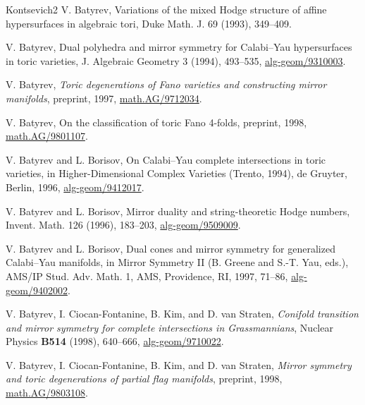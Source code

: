 \begin{thebibliography}{Kontsevich2}
\hypertarget{bib:Batyrev3}{}
V. Batyrev, Variations of the mixed Hodge structure of affine hypersurfaces in algebraic tori, Duke Math. J. 69 (1993), 349--409.

\hypertarget{bib:Batyrev4}{}
V. Batyrev, Dual polyhedra and mirror symmetry for Calabi--Yau
hypersurfaces in toric varieties,
J. Algebraic Geometry 3 (1994), 493--535, \href{https://arxiv.org/abs/alg-geom/9310003}{alg-geom/9310003}.

\hypertarget{bib:Batyrev5}{} V. Batyrev, \emph{Toric degenerations of Fano varieties and constructing mirror manifolds}, preprint, 1997, \href{https://arxiv.org/abs/alg-geom/9712034}{math.AG/9712034}.

\hypertarget{bib:Batyrev6}{}
V. Batyrev, On the classification of toric Fano 4-folds, preprint, 1998,
\href{https://arxiv.org/abs/math.AG/9801107}{math.AG/9801107}.

\hypertarget{bib:BB1}{}
V. Batyrev and L. Borisov, On Calabi--Yau complete intersections in toric varieties,
in Higher-Dimensional Complex Varieties (Trento, 1994), de Gruyter, Berlin, 1996,
\href{https://arxiv.org/abs/alg-geom/9412017}{alg-geom/9412017}.

\hypertarget{bib:BB2}{}
V. Batyrev and L. Borisov, Mirror duality and string-theoretic Hodge numbers,
Invent. Math. 126 (1996), 183--203, \href{https://arxiv.org/abs/alg-geom/9509009}{alg-geom/9509009}.

\hypertarget{bib:BB3}{}
V. Batyrev and L. Borisov, Dual cones and mirror symmetry for generalized Calabi--Yau
manifolds, in Mirror Symmetry II (B. Greene and S.-T. Yau, eds.),
AMS/IP Stud. Adv. Math. 1, AMS, Providence, RI, 1997, 71--86, \href{https://arxiv.org/abs/alg-geom/9402002}{alg-geom/9402002}.

\hypertarget{bib:BCFKvS1}{}
V. Batyrev, I. Ciocan-Fontanine, B. Kim, and D. van Straten, \emph{Conifold transition and mirror symmetry for complete intersections in Grassmannians}, Nuclear Physics \textbf{B514} (1998), 640--666, \href{https://arxiv.org/abs/alg-geom/9710022}{alg-geom/9710022}.

\hypertarget{bib:BCFKvS2}{} V. Batyrev, I. Ciocan-Fontanine, B. Kim, and D. van Straten, \emph{Mirror symmetry and toric degenerations of partial flag manifolds}, preprint, 1998, \href{https://arxiv.org/abs/math.AG/9803108}{math.AG/9803108}.


\end{thebibliography}
